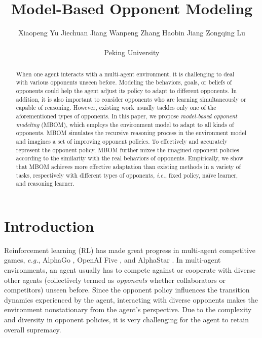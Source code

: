 \documentclass{article}
\title{Model-Based Opponent Modeling}
\author{%

  Xiaopeng Yu \quad Jiechuan Jiang \quad Wanpeng Zhang \quad Haobin Jiang \quad Zongqing Lu \\
  \\
  {Peking University}
  \And
}
\begin{document}
\maketitle


\begin{abstract}
When one agent interacts with a multi-agent environment, it is challenging to deal with various opponents unseen before. Modeling the behaviors, goals, or beliefs of opponents could help the agent adjust its policy to adapt to different opponents. In addition, it is also important to consider opponents who are learning simultaneously or capable of reasoning. However, existing work usually tackles only one of the aforementioned types of opponents. In this paper, we propose \textit{model-based opponent modeling} (MBOM), which employs the environment model to adapt to all kinds of opponents. MBOM simulates the recursive reasoning process in the environment model and imagines a set of improving opponent policies. To effectively and accurately represent the opponent policy, MBOM further mixes the imagined opponent policies according to the similarity with the real behaviors of opponents. Empirically, we show that MBOM achieves more effective adaptation than existing methods in a variety of tasks, respectively with different types of opponents, \emph{i.e.}, fixed policy, na\"ive learner, and reasoning learner.
\end{abstract}

\section{Introduction}

Reinforcement learning (RL) has made great progress in multi-agent competitive games, \emph{e.g.}, AlphaGo \citep{silver2016mastering}, OpenAI Five \citep{OpenAI_dota}, and AlphaStar \citep{vinyals2019grandmaster}. In multi-agent environments, an agent usually has to compete against or cooperate with diverse other agents (collectively termed as \emph{opponents} whether collaborators or competitors) unseen before. Since the opponent policy influences the transition dynamics experienced by the agent, interacting with diverse opponents makes the environment nonstationary from the agent's perspective. Due to the complexity and diversity in opponent policies, it is very challenging for the agent to retain overall supremacy.
\end{document}
